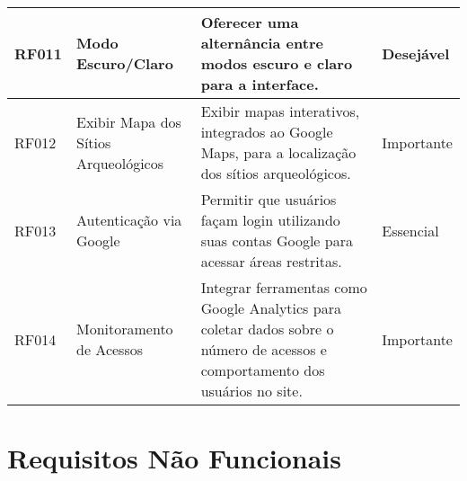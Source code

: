 {\begin{longtable}{|>{\raggedright}p{2.5cm}|>{\raggedright}p{4cm}|p{6cm}|>{\raggedright}p{2cm}|}
\hline
RF011 & Modo Escuro/Claro & Oferecer uma alternância entre modos escuro e claro para a interface. & Desejável \\
\hline
RF012 & Exibir Mapa dos Sítios Arqueológicos & Exibir mapas interativos, integrados ao Google Maps, para a localização dos sítios arqueológicos. & Importante \\
\hline
RF013 & Autenticação via Google & Permitir que usuários façam login utilizando suas contas Google para acessar áreas restritas. & Essencial \\
\hline
RF014 & Monitoramento de Acessos & Integrar ferramentas como Google Analytics para coletar dados sobre o número de acessos e comportamento dos usuários no site. & Importante \\
\hline
\end{longtable}
} %

\section{Requisitos Não Funcionais}

